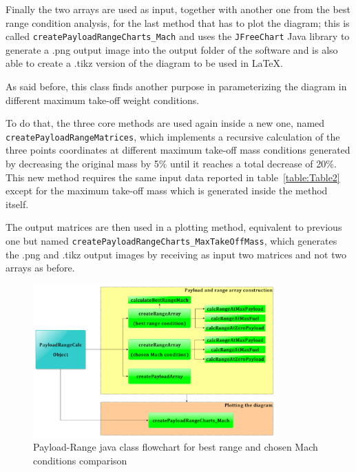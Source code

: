 \documentclass[a4paper,12pt,oneside]{book}
\begin{document}
\bigskip
Finally the two arrays are used as input, together with another one from the best range condition analysis, for the last method that has to plot the diagram; this is called \lstinline[language=Java]!createPayloadRangeCharts_Mach! and uses the \lstinline[language=Java]!JFreeChart! Java library to generate a .png output image into the output folder of the software and is also able to create a .tikz version of the diagram to be used in \LaTeX.

As said before, this class finds another purpose in parameterizing the diagram in different maximum take-off weight conditions.

To do that, the three core methods are used again inside a new one, named \lstinline[language=Java]!createPayloadRangeMatrices!, which implements a recursive calculation of the three points coordinates at different maximum take-off mass conditions generated by decreasing the original mass by 5$\%$ until it reaches a total decrease of 20$\%$. This new method requires the same input data reported in table~\ref{table:Table2} except for the maximum take-off mass which is generated inside the method itself.

The output matrices are then used in a plotting method, equivalent to previous one but named \lstinline[language=Java]!createPayloadRangeCharts_MaxTakeOffMass!, which generates the .png and .tikz output images by receiving as input two matrices and not two arrays as before.

\begin{figure}[!ht]
\centering
\includegraphics[keepaspectratio, width=0.83\textwidth]{PayloadRange_BestRange_Flowchart}
\caption{Payload-Range java class flowchart for best range and chosen Mach conditions comparison}
\label{fig:Figure3}
\end{figure}
\end{document}
